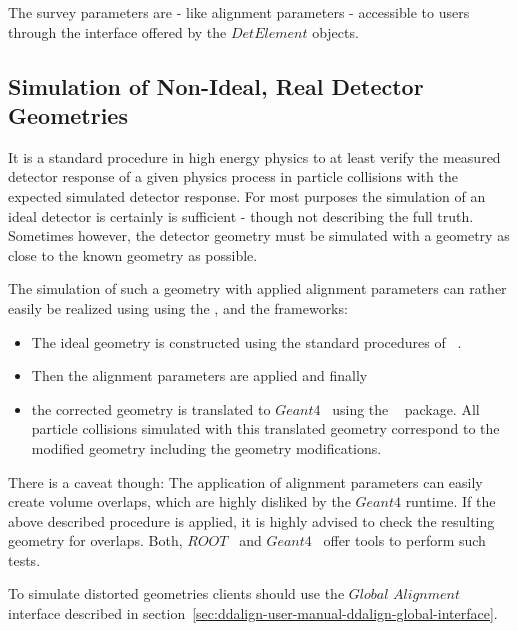 \documentclass[10pt,a4paper]{article}
\begin{document}
\noindent 
The survey parameters are - like alignment parameters - accessible to users
through the interface offered by the $DetElement$ objects.


\subsection{Simulation of Non-Ideal, Real Detector Geometries}
\label{subsect:ddalign-intro-simulate-misaligned-geometries}
\noindent
It is a standard procedure in high energy physics to at least verify 
the measured detector response of a given physics process in particle 
collisions with the expected simulated detector response.
For most purposes the simulation of an ideal detector is certainly is
sufficient - though not describing the full truth. Sometimes however, the
detector geometry must be simulated with a geometry as close to the 
known geometry as possible.

\noindent
The simulation of such a geometry with applied alignment parameters can 
rather easily be realized using using the \DDhep, \DDA and the \DDG frameworks:
\begin{itemize}\itemcompact
\item The ideal geometry is constructed using the standard procedures
    of \DDhep~\cite{bib:dd4hep}.
\item Then the alignment parameters are applied and finally
\item the corrected geometry is translated to $Geant4$~\cite{bib:geant4}
    using the \DDG~\cite{bib:DDG4} package.
    All particle collisions simulated with this translated geometry 
    correspond to the modified geometry including the geometry
    modifications.
\end{itemize}
There is a caveat though: The application of alignment parameters can
easily create volume overlaps, which are highly disliked by the $Geant4$ 
runtime. If the above described procedure is applied, it is highly advised 
to check the resulting geometry for overlaps. Both, 
$ROOT$~\cite{bib:ROOT-tgeo} and $Geant4$~\cite{bib:geant4} offer tools 
to perform such tests.

\noindent
To simulate distorted geometries clients should use the 
$Global$ $Alignment$  interface described in 
section~\ref{sec:ddalign-user-manual-ddalign-global-interface}.

\newpage
\end{document}
